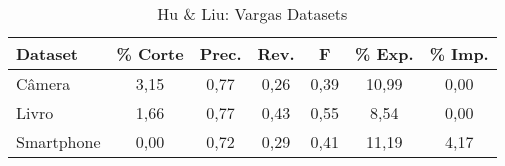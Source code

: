 \begin{table}[!htb]
\centering
\caption{Hu \& Liu: Vargas Datasets}
\label{tab:huLiuW2VinfW2V}
\begin{tabular}{lcccccc}
    \hline
    Dataset &  \% Corte & Prec. & Rev. & F & \% Exp. & \% Imp.   \\ \hline
Câmera     &  3,15 &  0,77 & 0,26 & 0,39 & 10,99 & 0,00 \\
Livro      &  1,66 &  0,77 & 0,43 & 0,55 & 8,54 & 0,00 \\
Smartphone &  0,00 &  0,72 & 0,29 & 0,41 & 11,19 & 4,17 \\ \hline
\end{tabular}
\end{table}
